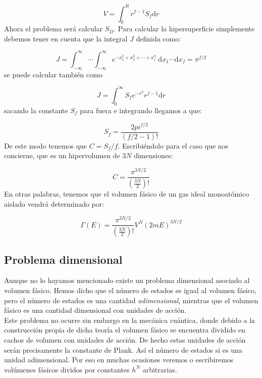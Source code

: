 \documentclass[12pt,a4paper]{article}
\numberwithin{equation}{section}
\numberwithin{figure}{section}
\newcommand{\parentesis}[1]{\left( #1  \right)}
\newcommand{\D}{\mathrm{d}}
\theoremstyle{definition}
\begin{document}
\begin{equation}
V = \int_0^R r^{f-1} S_f \D r
\end{equation}
Ahora el problema será calcular $S_D$. Para calcular la hipersuperficie simplemente debemos tener en cuenta que la integral $J$ definida como:

\begin{equation}
J = \int_{-\infty}^{\infty} \cdots \int_{-\infty}^{\infty} e^{-x_1^2+ x_2^2+\cdots + x_f^n} \ \D x_1 \cdots \D x_f = \pi^{f/2}
\end{equation} 
se puede calcular también como

\begin{equation}
J = \int_0^\infty S_f e^{-r^2} r^{f-1} \D r
\end{equation}
sacando la constante $S_f$ para fuera e integrando llegamos a que:

\begin{equation}
S_f = \frac{2 pi^{f/2}}{\parentesis{f/2-1}!}
\end{equation}
De este modo tenemos que $C = S_f / f$. Escribiéndolo para el caso que nos concierne, que es un hipervolumen de $3N$ dimensiones:

\begin{equation}
C = \frac{\pi^{3N/2}}{\parentesis{\frac{3N}{2}}!}
\end{equation}
En otras palabras, tenemos que el volumen fásico de un gas ideal monoatómico aislado vendrá determinado por:

\begin{equation}
\Gamma (E) = \frac{\pi^{3N/2}}{\parentesis{\frac{3N}{2}}!} V^N (2mE)^{3N/2}
\end{equation}

\subsection{Problema dimensional}

Aunque no lo hayamos mencionado existe un problema dimensional asociado al volumen fásico. Hemos dicho que el número de estados es igual al volumen fásico, pero el número de estados es una cantidad \textit{adimensional}, mientras que el volumen fásico es una cantidad dimensional con unidades de acción. \\

Este problema no ocurre sin embargo en la mecánica cuántica, donde debido a la construcción propia de dicha teoría el volumen fásico se encuentra dividido en cachos de volumen con unidades de acción. De hecho estas unidades de acción serán precisamente la constante de Plank. Así el número de estados si es una unidad adimensional. Por eso en muchas ocasiones veremos o escribiremos volúmenes fásicos dividos por constantes $h^N$ arbitrarias. \\
\end{document}
